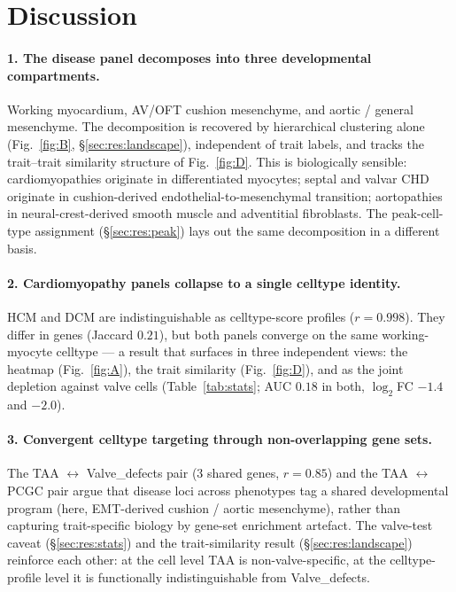 \documentclass[11pt,a4paper]{article}
\begin{document}
\section{Discussion}
\label{sec:discussion}

\paragraph{1. The disease panel decomposes into three developmental compartments.}
Working myocardium, AV/OFT cushion mesenchyme, and aortic / general
mesenchyme. The decomposition is recovered by hierarchical clustering
alone (Fig.~\ref{fig:B}, \S\ref{sec:res:landscape}), independent of trait
labels, and tracks the trait--trait similarity structure of
Fig.~\ref{fig:D}. This is biologically sensible: cardiomyopathies
originate in differentiated myocytes; septal and valvar CHD originate in
cushion-derived endothelial-to-mesenchymal transition; aortopathies in
neural-crest-derived smooth muscle and adventitial fibroblasts. The
peak-cell-type assignment (\S\ref{sec:res:peak}) lays out the same
decomposition in a different basis.

\paragraph{2. Cardiomyopathy panels collapse to a single celltype identity.}
HCM and DCM are indistinguishable as celltype-score profiles
($r=0.998$). They differ in genes (Jaccard $0.21$), but both panels
converge on the same working-myocyte celltype --- a result that surfaces
in three independent views: the heatmap (Fig.~\ref{fig:A}), the trait
similarity (Fig.~\ref{fig:D}), and as the joint depletion against valve
cells (Table~\ref{tab:stats}; AUC $0.18$ in both, $\log_2$FC $-1.4$ and
$-2.0$).

\paragraph{3. Convergent celltype targeting through non-overlapping gene sets.}
The TAA $\leftrightarrow$ Valve\_defects pair (3 shared genes,
$r = 0.85$) and the TAA $\leftrightarrow$ PCGC pair argue that disease
loci across phenotypes tag a shared developmental program (here,
EMT-derived cushion / aortic mesenchyme), rather than capturing
trait-specific biology by gene-set enrichment artefact. The valve-test
caveat (\S\ref{sec:res:stats}) and the trait-similarity result
(\S\ref{sec:res:landscape}) reinforce each other: at the cell level TAA
is non-valve-specific, at the celltype-profile level it is functionally
indistinguishable from Valve\_defects.
\end{document}
